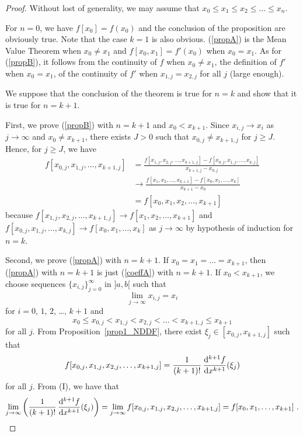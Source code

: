 \begin{proof}
Without lost of generality, we may assume that
$x_0\leq x_1 \leq x_2 \leq \ldots \leq x_n$.

For $n=0$, we have $f[x_0] = f(x_0)$ and the conclusion of the
proposition are obviously true.  Note that the case $k=1$ is also
obvious.  (\ref{propA}) is the Mean Value Theorem when $x_0 \neq x_1$
and $f[x_0,x_1] = f'(x_0)$ when $x_0 = x_1$.  As for
(\ref{propB}), it follows from the continuity of $f$ when
$x_0 \neq x_1$, the definition of $f'$ when $x_0 = x_1$, of the
continuity of $f'$ when $x_{1,j} = x_{2,j}$ for all $j$ (large enough).

We suppose that the conclusion of the theorem is true for $n=k$ and
show that it is true for $n=k+1$.

First, we prove (\ref{propB}) with $n=k+1$ and $x_0 < x_{k+1}$.  Since
$x_{i,j}\rightarrow x_i$ as $j\rightarrow \infty$ and
$x_0 \neq x_{k+1}$, there exists $J>0$ such that
$x_{0,j} \neq x_{k+1,j}$ for $j \geq J$.  Hence, for $j\geq J$, we have
\begin{align*}
f[x_{0,j}, x_{1,j},\ldots,x_{k+1,j}]
&=
\frac{f[x_{1,j},x_{2,j},\ldots,x_{k+1,j}] -
f[x_{0,j},x_{1,j},\ldots,x_{k,j}]}{x_{k+1,j} - x_{0,j}} \\
&\rightarrow 
\frac{f[x_1,x_2,\ldots,x_{k+1}] -
f[x_0,x_1,\ldots,x_k]}{x_{k+1} - x_0} \\
&= f[x_0,x_1,x_2, \ldots, x_{k+1}]
\end{align*}
because
$\displaystyle f[x_{1,j},x_{2,j},\ldots,x_{k+1,j}] \rightarrow
f[x_1,x_2,\ldots,x_{k+1}]$ and \\
$\displaystyle f[x_{0,j},x_{1,j},\ldots,x_{k,j}] \rightarrow
f[x_0,x_1,\ldots,x_k]$
as $j\rightarrow \infty$ by hypothesis of induction for $n=k$.

Second, we prove (\ref{propA}) with $n=k+1$.  If
$x_0=x_1=\ldots=x_{k+1}$, then (\ref{propA}) with $n=k+1$ is just
(\ref{coeffA}) with $n=k+1$.  If $x_0 < x_{k+1}$, we choose sequences
$\{x_{i,j}\}_{j=0}^\infty$ in $]a,b[$ such that
\[
\lim_{j\rightarrow \infty} x_{i,j} = x_i
\]
for $i=0$, $1$, $2$, \ldots, $k+1$ and
\[
x_0 \leq x_{0,j} < x_{1,j} < x_{2,j} < \ldots < x_{k+1,j} \leq x_{k+1}
\]
for all $j$.  From Proposition~\ref{prop1_NDDF}, there exist
$\xi_j \in [x_{0,j}, x_{k+1,j}]$ such that
\[
f[x_{0,j},x_{1,j},x_{2,j}, \ldots, x_{k+1,j}] =
\frac{1}{(k+1)!}\,\frac{\mathrm{d}^{k+1}{f}}{\mathrm{d}{x}^{k+1}}(\xi_j) 
\]
for all $j$.  From (I), we have that
\[
\lim_{j\rightarrow \infty}
\left( \frac{1}{(k+1)!}\,\frac{\mathrm{d}^{k+1}{f}}{\mathrm{d}{x}^{k+1}}(\xi_j) \right)
= \lim_{j\rightarrow \infty} f[x_{0,j}, x_{1,j}, x_{2,j}, \ldots, x_{k+1,j}]
= f[x_0,x_1, \ldots, x_{k+1}] \ . 
\]


\end{proof}
